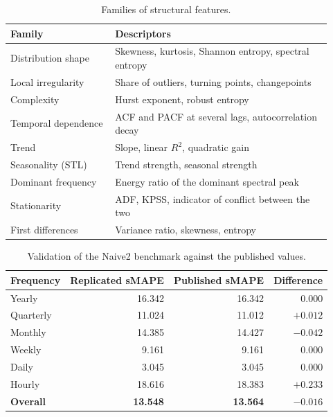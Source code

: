 \begin{table}[htbp]
\centering
\caption{Families of structural features.}
\label{tab:familias}
\begin{tabular}{p{0.30\linewidth}p{0.62\linewidth}}
\toprule
\textbf{Family} & \textbf{Descriptors} \\
\midrule
Distribution shape   & Skewness, kurtosis, Shannon entropy, spectral entropy \\
Local irregularity   & Share of outliers, turning points, changepoints \\
Complexity           & Hurst exponent, robust entropy \\
Temporal dependence  & ACF and PACF at several lags, autocorrelation decay \\
Trend                & Slope, linear $R^{2}$, quadratic gain \\
Seasonality (STL)    & Trend strength, seasonal strength \\
Dominant frequency   & Energy ratio of the dominant spectral peak \\
Stationarity         & ADF, KPSS, indicator of conflict between the two \\
First differences    & Variance ratio, skewness, entropy \\
\bottomrule
\end{tabular}
\end{table}

\begin{table}[htbp]
\centering
\caption{Validation of the Naive2 benchmark against the published values.}
\label{tab:naive2}
\begin{tabular}{lrrr}
\toprule
\textbf{Frequency} & \textbf{Replicated sMAPE} & \textbf{Published sMAPE} & \textbf{Difference} \\
\midrule
Yearly      & 16.342 & 16.342 & $0.000$ \\
Quarterly   & 11.024 & 11.012 & $+0.012$ \\
Monthly     & 14.385 & 14.427 & $-0.042$ \\
Weekly      &  9.161 &  9.161 & $0.000$ \\
Daily       &  3.045 &  3.045 & $0.000$ \\
Hourly      & 18.616 & 18.383 & $+0.233$ \\
\midrule
\textbf{Overall} & \textbf{13.548} & \textbf{13.564} & $\mathbf{-0.016}$ \\
\bottomrule
\end{tabular}
\end{table}



